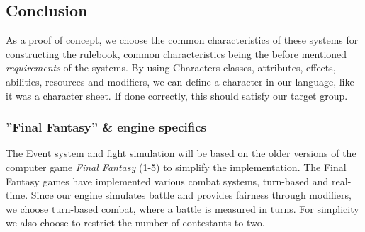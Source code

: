 \subsection*{Conclusion}
As a proof of concept, we choose the common characteristics of these systems for constructing the rulebook, common characteristics being the before mentioned \emph{requirements} of the systems.
By using Characters classes, attributes, effects, abilities, resources and modifiers, we can define a character in our language, like it was a character sheet. If done correctly, this should satisfy our target group.

\subsubsection*{''Final Fantasy'' \& engine specifics}
The Event system and fight simulation will be based on the older versions of the computer game \emph{Final Fantasy} (1-5) to simplify the implementation.
The Final Fantasy games have implemented various combat systems, turn-based and real-time.\cite{ffantasy}
Since our engine simulates battle and provides fairness through modifiers, we choose turn-based combat, where a battle is measured in turns.
For simplicity we also choose to restrict the number of contestants to two.



